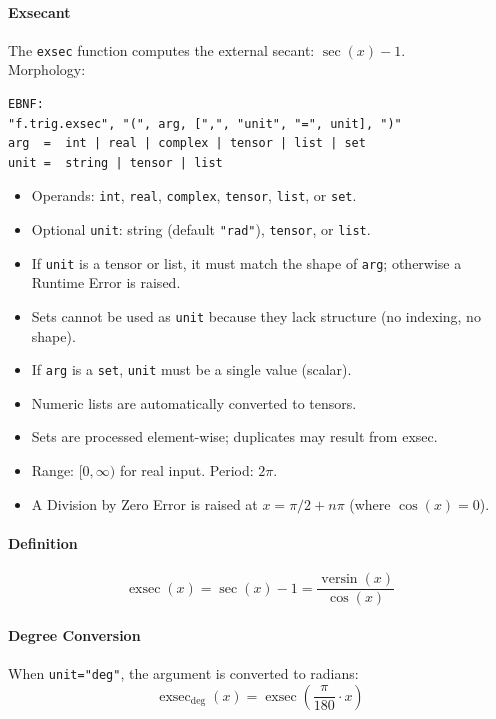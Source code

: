 \paragraph{Exsecant}
The \texttt{exsec} function computes the external secant: $\sec(x) - 1$.\\
Morphology:
\begin{verbatim}
EBNF:
"f.trig.exsec", "(", arg, [",", "unit", "=", unit], ")"
arg  =  int | real | complex | tensor | list | set
unit =  string | tensor | list
\end{verbatim}
\begin{itemize}
\item Operands: \texttt{int}, \texttt{real}, \texttt{complex}, \texttt{tensor}, \texttt{list}, or \texttt{set}.
\item Optional \texttt{unit}: string (default \texttt{"rad"}), \texttt{tensor}, or \texttt{list}.
\item If \texttt{unit} is a tensor or list, it must match the shape of \texttt{arg}; otherwise a Runtime Error is raised.
\item Sets cannot be used as \texttt{unit} because they lack structure (no indexing, no shape).
\item If \texttt{arg} is a \texttt{set}, \texttt{unit} must be a single value (scalar).
\item Numeric lists are automatically converted to tensors.
\item Sets are processed element-wise; duplicates may result from exsec.
\item Range: $[0, \infty)$ for real input. Period: $2\pi$.
\item A Division by Zero Error is raised at $x = \pi/2 + n\pi$ (where $\cos(x) = 0$).
\end{itemize}

\paragraph{Definition}
\[
\operatorname{exsec}(x) = \sec(x) - 1 = \frac{\operatorname{versin}(x)}{\cos(x)}
\]

\paragraph{Degree Conversion}
When \texttt{unit="deg"}, the argument is converted to radians:
\[
\operatorname{exsec}_{\text{deg}}(x) = \operatorname{exsec}\left(\frac{\pi}{180} \cdot x\right)
\]

